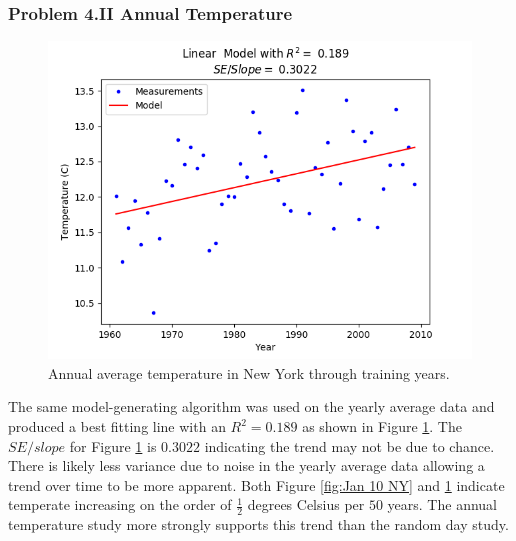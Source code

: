 \documentclass[letterpaper]{article}
\begin{document}
	\subsubsection*{Problem 4.II Annual Temperature}
	\begin{figure}[h]
		\includegraphics[scale=0.625]{Figure_2_A2II}
		\centering
		\caption{Annual average temperature in New York through training years.}
		\label{fig:Yearly Average NY}
	\end{figure}
	
	The same model-generating algorithm was used on the yearly average data and produced a best fitting line with an $R^2 = 0.189$ as shown in Figure \ref{fig:Yearly Average NY}.
	The $SE/slope$ for Figure \ref{fig:Yearly Average NY} is $0.3022$ indicating the trend may not be due to chance.
	There is likely less variance due to noise in the yearly average data allowing a trend over time to be more apparent.
	Both Figure \ref{fig:Jan 10 NY} and \ref{fig:Yearly Average NY} indicate temperate increasing on the order of $\frac{1}{2}$ degrees Celsius per $50$ years.
	The annual temperature study more strongly supports this trend than the random day study.
\end{document}
